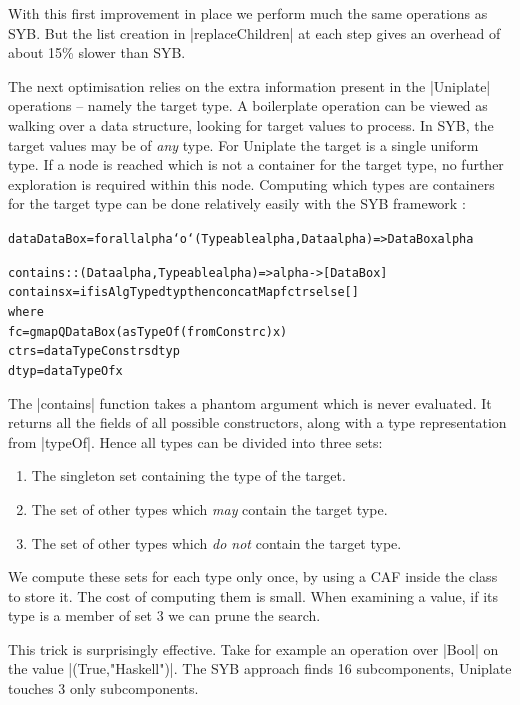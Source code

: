 \documentclass[preprint]{sigplanconf}
\newenvironment{code}{\begin{alltt}\small}{\end{alltt}}
\newcommand{\ignore}{}
\begin{document}
With this first improvement in place we perform much the same operations as SYB. But the list creation in |replaceChildren| at each step gives an overhead of about 15\% slower than SYB.

The next optimisation relies on the extra information present in the |Uniplate| operations -- namely the target type. A boilerplate operation can be viewed as walking over a data structure, looking for target values to process. In SYB, the target values may be of \textit{any} type. For Uniplate the target is a single uniform type. If a node is reached which is not a container for the target type, no further exploration is required within this node. Computing which types are containers for the target type can be done relatively easily with the SYB framework \citep{lammel:syb2}:

\ignore\begin{code}
data DataBox = forall alpha `o` (Typeable alpha, Data alpha) => DataBox alpha

contains :: (Data alpha, Typeable alpha) => alpha -> [DataBox]
contains x = if isAlgType dtyp then concatMap f ctrs else []
    where
        f c = gmapQ DataBox (asTypeOf (fromConstr c) x)
        ctrs = dataTypeConstrs dtyp
        dtyp = dataTypeOf x
\end{code}

The \ignore|contains| function takes a phantom argument which is never evaluated. It returns all the fields of all possible constructors, along with a type representation from |typeOf|. Hence all types can be divided into three sets:

\begin{enumerate}
\item The singleton set containing the type of the target.
\item The set of other types which \textit{may} contain the target type.
\item The set of other types which \textit{do not} contain the target type.
\end{enumerate}

We compute these sets for each type only once, by using a CAF inside the class to store it. The cost of computing them is small. When examining a value, if its type is a member of set 3 we can prune the search.

This trick is surprisingly effective. Take for example an operation over |Bool| on the value |(True,"Haskell")|. The SYB approach finds 16 subcomponents, Uniplate touches 3 only subcomponents.
\end{document}
